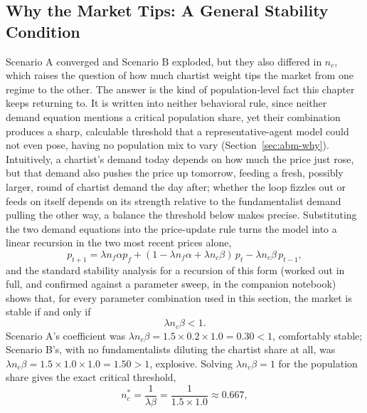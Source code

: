 \documentclass[../ai_in_finance]{subfiles}
\begin{document}
\subsection{Why the Market Tips: A General Stability Condition}
\label{sec:abm-stability}

Scenario A converged and Scenario B exploded, but they also differed in $n_c$, which raises the question of how much chartist weight tips the market from one regime to the other. The answer is the kind of population-level fact this chapter keeps returning to. It is written into neither behavioral rule, since neither demand equation mentions a critical population share, yet their combination produces a sharp, calculable threshold that a representative-agent model could not even pose, having no population mix to vary (Section~\ref{sec:abm-why}). Intuitively, a chartist's demand today depends on how much the price just rose, but that demand also pushes the price up tomorrow, feeding a fresh, possibly larger, round of chartist demand the day after; whether the loop fizzles out or feeds on itself depends on its strength relative to the fundamentalist demand pulling the other way, a balance the threshold below makes precise. Substituting the two demand equations into the price-update rule turns the model into a linear recursion in the
two most recent prices alone,
\begin{equation}
p_{t+1} = \lambda n_f\alpha p_f + (1-\lambda n_f\alpha+\lambda n_c\beta)\,p_t - \lambda n_c\beta\,p_{t-1},
\label{eq:abm-recursion}
\end{equation} 
and the standard stability analysis for a recursion of this form (worked out in full, and confirmed against a parameter sweep, 
in the companion notebook) shows that, for every parameter combination used in this section, the market is stable if and only if
\begin{equation}
\lambda n_c \beta < 1.
\label{eq:abm-stability}
\end{equation}
Scenario A's coefficient was $\lambda n_c \beta = 1.5 \times 0.2 \times 1.0 = 0.30 < 1$, comfortably stable; Scenario B's, with no fundamentalists diluting the chartist share at all, was $\lambda n_c \beta = 1.5 \times 1.0 \times 1.0 = 1.50 > 1$, explosive. Solving $\lambda n_c \beta = 1$ for the population share gives the exact critical threshold,
\begin{equation*}
n_c^{*} = \frac{1}{\lambda \beta} = \frac{1}{1.5 \times 1.0} \approx 0.667,
\end{equation*}
\end{document}
